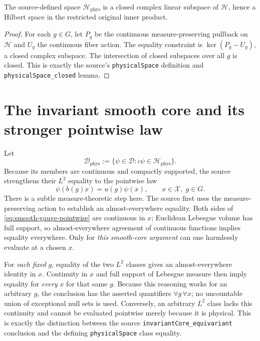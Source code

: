 \begin{theorem}
The source-defined space $\mathscr H_{\mathrm{phys}}$ is a closed complex
linear subspace of $\mathscr H$, hence a Hilbert space in the restricted
original inner product.
\end{theorem}
\begin{proof}
For each $g\in G$, let $P_g$ be the continuous measure-preserving
pullback on $\mathscr H$ and $U_g$ the continuous fiber action. The
equality constraint is $\ker(P_g-U_g)$, a closed complex subspace.
The intersection of closed subspaces over all $g$ is closed. This is
exactly the source's \texttt{physicalSpace} definition and
\texttt{physicalSpace\_closed} lemma.
\end{proof}

\section{The invariant smooth core and its stronger pointwise law}
Let
\begin{equation}\label{eq:invariant-core}
 \mathscr D_{\mathrm{phys}}
 :=\{\psi\in\mathscr D:\iota\psi\in\mathscr H_{\mathrm{phys}}\}.
\end{equation}
Because its members are continuous and compactly supported, the source
strengthens their $L^2$ equality to the pointwise law
\begin{equation}\label{eq:smooth-gauge-pointwise}
 \psi(b(g)x)=u(g)\psi(x),\qquad
 x\in\mathcal X,\;g\in G.
\end{equation}
There is a subtle measure-theoretic step here. The source first uses
the measure-preserving action to establish an almost-everywhere equality.
Both sides of \eqref{eq:smooth-gauge-pointwise} are continuous in $x$;
Euclidean Lebesgue volume has full support, so almost-everywhere agreement
of continuous functions implies equality everywhere. Only for \emph{this
smooth-core argument} can one harmlessly evaluate at a chosen $x$.

\begin{remark}
For \emph{each fixed} $g$, equality of the two $L^2$ classes gives
an almost-everywhere identity in $x$. Continuity in $x$ and full
support of Lebesgue measure then imply equality for \emph{every}
$x$ for that same $g$. Because this reasoning works for an
arbitrary $g$, the conclusion has the asserted quantifiers
$\forall g\,\forall x$; no uncountable union of exceptional null
sets is used. Conversely, an arbitrary $L^2$ class lacks this
continuity and cannot be evaluated pointwise merely because it
is physical. This is exactly the distinction between the source
\texttt{invariantCore\_equivariant} conclusion and the defining
\texttt{physicalSpace} class equality.
\end{remark}


